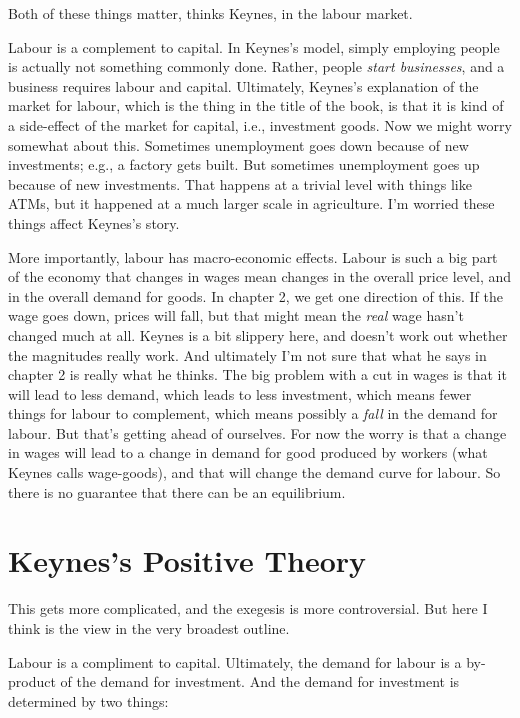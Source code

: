 \documentclass[
  11pt,
  letterpaper,
  DIV=11,
  numbers=noendperiod,
  oneside]{scrartcl}
\begin{document}
Both of these things matter, thinks Keynes, in the labour market.

Labour is a complement to capital. In Keynes's model, simply employing
people is actually not something commonly done. Rather, people
\emph{start businesses}, and a business requires labour and capital.
Ultimately, Keynes's explanation of the market for labour, which is the
thing in the title of the book, is that it is kind of a side-effect of
the market for capital, i.e., investment goods. Now we might worry
somewhat about this. Sometimes unemployment goes down because of new
investments; e.g., a factory gets built. But sometimes unemployment goes
up because of new investments. That happens at a trivial level with
things like ATMs, but it happened at a much larger scale in agriculture.
I'm worried these things affect Keynes's story.

More importantly, labour has macro-economic effects. Labour is such a
big part of the economy that changes in wages mean changes in the
overall price level, and in the overall demand for goods. In chapter 2, we get one
direction of this. If the wage goes down, prices will fall, but that
might mean the \emph{real} wage hasn't changed much at all. Keynes is a
bit slippery here, and doesn't work out whether the magnitudes really
work. And ultimately I'm not sure that what he says in chapter 2 is
really what he thinks. The big problem with a cut in wages is that it
will lead to less demand, which leads to less investment, which means
fewer things for labour to complement, which means possibly a
\emph{fall} in the demand for labour. But that's getting ahead of
ourselves. For now the worry is that a change in wages will lead to a
change in demand for good produced by workers (what Keynes calls
wage-goods), and that will change the demand curve for labour. So there
is no guarantee that there can be an equilibrium.

\section{Keynes's Positive Theory}\label{keyness-positive-theory}

This gets more complicated, and the exegesis is more controversial. But
here I think is the view in the very broadest outline.

Labour is a compliment to capital. Ultimately, the demand for labour is
a by-product of the demand for investment. And the demand for investment
is determined by two things:
\end{document}
